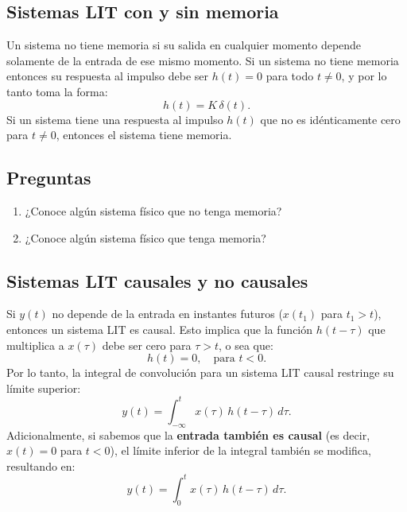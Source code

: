 \documentclass[11pt,a4paper,openany]{book}
\begin{document}
\subsection{Sistemas LIT con y sin memoria}

Un sistema no tiene memoria si su salida en cualquier momento depende solamente de la entrada de ese mismo momento. Si un sistema no tiene memoria entonces su respuesta al impulso debe ser $h(t) = 0$ para todo $t \neq 0$, y por lo tanto toma la forma:
\begin{equation}
	h(t) = K \, \delta(t) .
\end{equation}
Si un sistema tiene una respuesta al impulso $h(t)$ que no es idénticamente cero para $t \neq 0$, entonces el sistema tiene memoria.

\subsection{Preguntas}

\begin{enumerate}
	\item ¿Conoce algún sistema físico que no tenga memoria?
	\item ¿Conoce algún sistema físico que tenga memoria?
\end{enumerate}

\subsection{Sistemas LIT causales y no causales}

Si $y(t)$ no depende de la entrada en instantes futuros ($x(t_{1})$ para $t_{1} > t$), entonces un sistema LIT es causal. Esto implica que la función $h(t-\tau)$ que multiplica a $x(\tau)$ debe ser cero para $\tau > t$, o sea que:
\begin{equation}
	h(t) = 0, \quad \text{para } t < 0.
\end{equation}
Por lo tanto, la integral de convolución para un sistema LIT causal restringe su límite superior:
\begin{equation}
	y(t) = \int_{-\infty}^{t} x(\tau) \, h(t-\tau) \, d\tau .
\end{equation}
Adicionalmente, si sabemos que la \textbf{entrada también es causal} (es decir, $x(t) = 0$ para $t < 0$), el límite inferior de la integral también se modifica, resultando en:
\begin{equation}
	y(t) = \int_{0}^{t} x(\tau) \, h(t-\tau) \, d\tau .
\end{equation}
\end{document}
